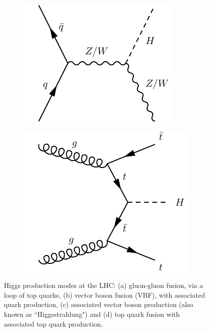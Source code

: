 \documentclass[10pt]{article}
\begin{document}
\begin{figure}[h!]
\begin{subfigure}[b]{0.22\textwidth}
\includegraphics[width=\textwidth]{"HiggsProduction/wzH"}
\caption{}
\end{subfigure}
    \begin{subfigure}[b]{0.22\textwidth}
\includegraphics[width=\textwidth]{"HiggsProduction/ttH"}
\caption{}
\end{subfigure}
\caption{Higgs production modes at the LHC: (a) gluon-gluon fusion, via a loop of top quarks, (b) vector boson fusion (VBF), with associated quark production, (c) associated vector boson production (also known as “Higgsstrahlung") and (d) top quark fusion with associated top quark production.}
\label{higgs_prod}
\end{figure}
\end{document}
